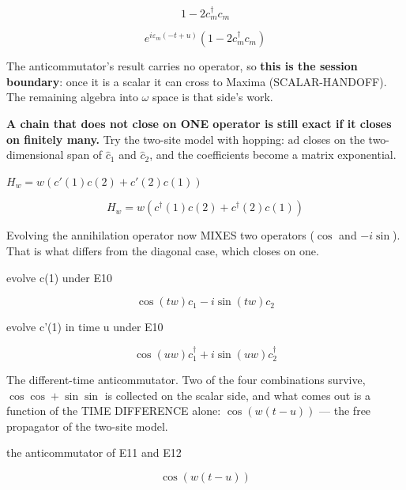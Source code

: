 \documentclass[dvipdfmx]{article}
\begin{document}
\begin{equation}
  1 - 2 {c}_{m}^{\dagger} {c}_{m}
  \label{eq:E8}
\end{equation}

\begin{equation}
  e^{i \varepsilon_{m} \left(- t + u\right)} \left(1 - 2 {c}_{m}^{\dagger} {c}_{m}\right)
  \label{eq:E9}
\end{equation}

The anticommutator's result carries no operator, so \textbf{this is the session boundary}: once it is a scalar it can cross to Maxima (SCALAR-HANDOFF). The remaining algebra into $\omega$ space is that side's work.

\textbf{A chain that does not close on ONE operator is still exact if it closes on finitely many.} Try the two-site model with hopping: $\mathrm{ad}$ closes on the two-dimensional span of $\hat c_1$ and $\hat c_2$, and the coefficients become a matrix exponential.

$H_w = w (c'(1) c(2) + c'(2) c(1))$

\begin{equation}
  H_w = w (c^{\dagger}(1) c(2) + c^{\dagger}(2) c(1))
  \label{eq:E10}
\end{equation}

Evolving the annihilation operator now MIXES two operators ($\cos$ and $-i\sin$). That is what differs from the diagonal case, which closes on one.

evolve c(1) under E10

\begin{equation}
  \cos{\left(t w \right)} c_{1} -  i \sin{\left(t w \right)} c_{2}
  \label{eq:E11}
\end{equation}

evolve c'(1) in time u under E10

\begin{equation}
  \cos{\left(u w \right)} c^{\dagger}_{1} + i \sin{\left(u w \right)} c^{\dagger}_{2}
  \label{eq:E12}
\end{equation}

The different-time anticommutator. Two of the four combinations survive, $\cos\cos+\sin\sin$ is collected on the scalar side, and what comes out is a function of the TIME DIFFERENCE alone: $\cos(w(t-u))$ — the free propagator of the two-site model.

the anticommutator of E11 and E12

\begin{equation}
  \cos{\left(w \left(t - u\right) \right)}
  \label{eq:E13}
\end{equation}
\end{document}
